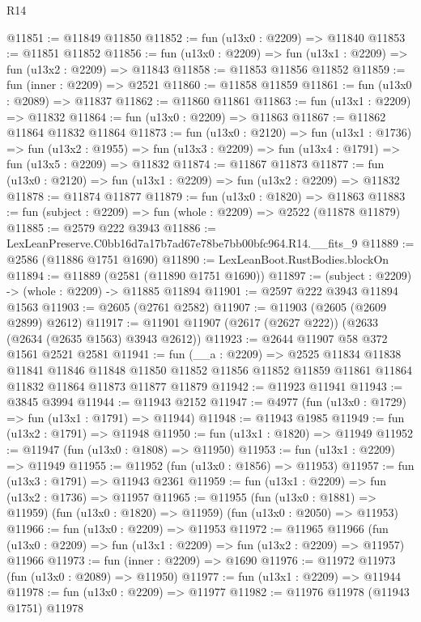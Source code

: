 \begin{lexlean}{R14}
\begin{coremodule}
@11851 := @11849 @11850
@11852 := fun (u13x0 : @2209) => @11840
@11853 := @11851 @11852
@11856 := fun (u13x0 : @2209) => fun (u13x1 : @2209) => fun (u13x2 : @2209) => @11843
@11858 := @11853 @11856 @11852
@11859 := fun (inner : @2209) => @2521
@11860 := @11858 @11859
@11861 := fun (u13x0 : @2089) => @11837
@11862 := @11860 @11861
@11863 := fun (u13x1 : @2209) => @11832
@11864 := fun (u13x0 : @2209) => @11863
@11867 := @11862 @11864 @11832 @11864
@11873 := fun (u13x0 : @2120) =>
  fun (u13x1 : @1736) =>
  fun (u13x2 : @1955) => fun (u13x3 : @2209) => fun (u13x4 : @1791) => fun (u13x5 : @2209) => @11832
@11874 := @11867 @11873
@11877 := fun (u13x0 : @2120) => fun (u13x1 : @2209) => fun (u13x2 : @2209) => @11832
@11878 := @11874 @11877
@11879 := fun (u13x0 : @1820) => @11863
@11883 := fun (subject : @2209) => fun (whole : @2209) => @2522 (@11878 @11879)
@11885 := @2579 @222 @3943
@11886 := LexLeanPreserve.C0bb16d7a17b7ad67e78be7bb00bfc964.R14.__fits_9
@11889 := @2586 (@11886 @1751 @1690)
@11890 := LexLeanBoot.RustBodies.blockOn
@11894 := @11889 (@2581 (@11890 @1751 @1690))
@11897 := (subject : @2209) -> (whole : @2209) -> @11885 @11894
@11901 := @2597 @222 @3943 @11894 @1563
@11903 := @2605 (@2761 @2582)
@11907 := @11903 (@2605 (@2609 @2899) @2612)
@11917 := @11901 @11907 (@2617 (@2627 @222)) (@2633 (@2634 (@2635 @1563) @3943 @2612))
@11923 := @2644 @11907 @58 @372 @1561 @2521 @2581
@11941 := fun (__a : @2209) =>
  @2525
    @11834
    @11838
    @11841
    @11846
    @11848
    @11850
    @11852
    @11856
    @11852
    @11859
    @11861
    @11864
    @11832
    @11864
    @11873
    @11877
    @11879
@11942 := @11923 @11941
@11943 := @3845 @3994
@11944 := @11943 @2152
@11947 := @4977 (fun (u13x0 : @1729) => fun (u13x1 : @1791) => @11944)
@11948 := @11943 @1985
@11949 := fun (u13x2 : @1791) => @11948
@11950 := fun (u13x1 : @1820) => @11949
@11952 := @11947 (fun (u13x0 : @1808) => @11950)
@11953 := fun (u13x1 : @2209) => @11949
@11955 := @11952 (fun (u13x0 : @1856) => @11953)
@11957 := fun (u13x3 : @1791) => @11943 @2361
@11959 := fun (u13x1 : @2209) => fun (u13x2 : @1736) => @11957
@11965 := @11955
    (fun (u13x0 : @1881) => @11959)
    (fun (u13x0 : @1820) => @11959)
    (fun (u13x0 : @2050) => @11953)
@11966 := fun (u13x0 : @2209) => @11953
@11972 := @11965
    @11966
    (fun (u13x0 : @2209) => fun (u13x1 : @2209) => fun (u13x2 : @2209) => @11957)
    @11966
@11973 := fun (inner : @2209) => @1690
@11976 := @11972 @11973 (fun (u13x0 : @2089) => @11950)
@11977 := fun (u13x1 : @2209) => @11944
@11978 := fun (u13x0 : @2209) => @11977
@11982 := @11976 @11978 (@11943 @1751) @11978

\end{coremodule}
\end{lexlean}
